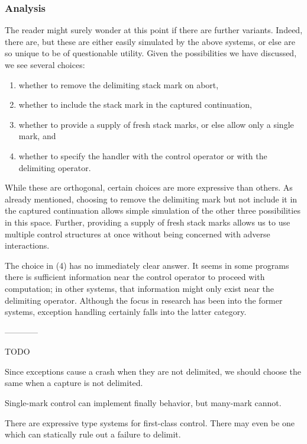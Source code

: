 \documentclass[11pt]{article}
\newcommand{\maybePage}{\newpage}
\begin{document}
\maybePage
\subsubsection{Analysis}

The reader might surely wonder at this point if there are further variants.
Indeed, there are, but these are either easily simulated by the above systems, or else are so unique to be of questionable utility.
Given the possibilities we have discussed, we see several choices:
\begin{enumerate}
\item whether to remove the delimiting stack mark on abort,
\item whether to include the stack mark in the captured continuation,
\item whether to provide a supply of fresh stack marks, or else allow only a single mark, and
\item whether to specify the handler with the control operator or with the delimiting operator.
\end{enumerate}
While these are orthogonal, certain choices are more expressive than others.
As already mentioned, choosing to remove the delimiting mark but not include it in the captured continuation allows simple simulation of the other three possibilities in this space.
Further, providing a supply of fresh stack marks allows us to use multiple control structures at once without being concerned with adverse interactions.

The choice in (4) has no immediately clear answer.
It seems in some programs there is sufficient information near the control operator to proceed with computation; in other systems, that information might only exist near the delimiting operator.
Although the focus in research has been into the former systems, exception handling certainly falls into the latter category.



\maybePage

------------

TODO

Since exceptions cause a crash when they are not delimited, we should choose the same when a capture is not delimited.

Single-mark control can implement finally behavior, but many-mark cannot.

There are expressive type systems for first-class control.
There may even be one which can statically rule out a failure to delimit.
\end{document}
